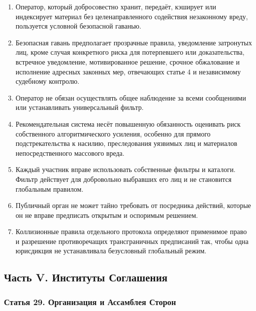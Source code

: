\documentclass[
  russian,
  11pt,
  a4paper,
]{article}
\providecommand{\tightlist}{%
  \setlength{\itemsep}{0pt}\setlength{\parskip}{0pt}}
\begin{document}
\begin{enumerate}
\def\labelenumi{\arabic{enumi}.}
\tightlist
\item
  Оператор, который добросовестно хранит, передаёт, кэширует или
  индексирует материал без целенаправленного содействия незаконному
  вреду, пользуется условной безопасной гаванью.
\item
  Безопасная гавань предполагает прозрачные правила, уведомление
  затронутых лиц, кроме случая конкретного риска для потерпевшего или
  доказательства, встречное уведомление, мотивированное решение, срочное
  обжалование и исполнение адресных законных мер, отвечающих статье 4 и
  независимому судебному контролю.
\item
  Оператор не обязан осуществлять общее наблюдение за всеми сообщениями
  или устанавливать универсальный фильтр.
\item
  Рекомендательная система несёт повышенную обязанность оценивать риск
  собственного алгоритмического усиления, особенно для прямого
  подстрекательства к насилию, преследования уязвимых лиц и материалов
  непосредственного массового вреда.
\item
  Каждый участник вправе использовать собственные фильтры и каталоги.
  Фильтр действует для добровольно выбравших его лиц и не становится
  глобальным правилом.
\item
  Публичный орган не может тайно требовать от посредника действий,
  которые он не вправе предписать открытым и оспоримым решением.
\item
  Коллизионные правила отдельного протокола определяют применимое право
  и разрешение противоречащих трансграничных предписаний так, чтобы одна
  юрисдикция не устанавливала безусловный глобальный режим.
\end{enumerate}

\subsection{Часть V. Институты
Соглашения}\label{ux447ux430ux441ux442ux44c-v-ux438ux43dux441ux442ux438ux442ux443ux442ux44b-ux441ux43eux433ux43bux430ux448ux435ux43dux438ux44f}

\subsubsection{Статья 29. Организация и Ассамблея
Сторон}\label{ux441ux442ux430ux442ux44cux44f-29-ux43eux440ux433ux430ux43dux438ux437ux430ux446ux438ux44f-ux438-ux430ux441ux441ux430ux43cux431ux43bux435ux44f-ux441ux442ux43eux440ux43eux43d}
\end{document}
